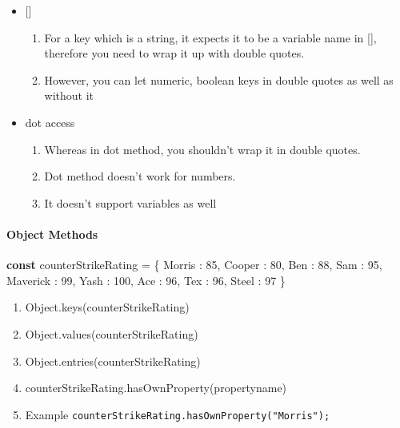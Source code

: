 \documentclass[
  paper=a4,
  ,captions=tableheading
]{scrartcl}
\newenvironment{Shaded}{}{}
\newcommand{\DataTypeTok}[1]{\textcolor[rgb]{0.56,0.13,0.00}{#1}}
\newcommand{\DecValTok}[1]{\textcolor[rgb]{0.25,0.63,0.44}{#1}}
\newcommand{\KeywordTok}[1]{\textcolor[rgb]{0.00,0.44,0.13}{\textbf{#1}}}
\newcommand{\NormalTok}[1]{#1}
\newcommand{\OperatorTok}[1]{\textcolor[rgb]{0.40,0.40,0.40}{#1}}
\providecommand{\tightlist}{%
  \setlength{\itemsep}{0pt}\setlength{\parskip}{0pt}}
\begin{document}
\begin{itemize}
\tightlist
\item
  {[}{]}

  \begin{enumerate}
  \def\labelenumi{\arabic{enumi}.}
  \tightlist
  \item
    For a key which is a string, it expects it to be a variable name in
    {[}{]}, therefore you need to wrap it up with double quotes.
  \item
    However, you can let numeric, boolean keys in double quotes as well
    as without it
  \end{enumerate}
\item
  dot access

  \begin{enumerate}
  \def\labelenumi{\arabic{enumi}.}
  \tightlist
  \item
    Whereas in dot method, you shouldn't wrap it in double quotes.
  \item
    Dot method doesn't work for numbers.
  \item
    It doesn't support variables as well
  \end{enumerate}
\end{itemize}

\hypertarget{object-methods}{%
\paragraph{Object Methods}\label{object-methods}}

\begin{Shaded}
\begin{Highlighting}[]
\KeywordTok{const}\NormalTok{ counterStrikeRating }\OperatorTok{=}\NormalTok{ \{}
    \DataTypeTok{Morris} \OperatorTok{:} \DecValTok{85}\OperatorTok{,}
    \DataTypeTok{Cooper} \OperatorTok{:} \DecValTok{80}\OperatorTok{,}
    \DataTypeTok{Ben} \OperatorTok{:} \DecValTok{88}\OperatorTok{,}
    \DataTypeTok{Sam} \OperatorTok{:} \DecValTok{95}\OperatorTok{,}
    \DataTypeTok{Maverick} \OperatorTok{:} \DecValTok{99}\OperatorTok{,}
    \DataTypeTok{Yash} \OperatorTok{:} \DecValTok{100}\OperatorTok{,}
    \DataTypeTok{Ace} \OperatorTok{:} \DecValTok{96}\OperatorTok{,}
    \DataTypeTok{Tex} \OperatorTok{:} \DecValTok{96}\OperatorTok{,}
    \DataTypeTok{Steel} \OperatorTok{:} \DecValTok{97}
\NormalTok{\}}
\end{Highlighting}
\end{Shaded}

\begin{enumerate}
\def\labelenumi{\arabic{enumi}.}
\tightlist
\item
  Object.keys(counterStrikeRating)
\item
  Object.values(counterStrikeRating)
\item
  Object.entries(counterStrikeRating)
\item
  counterStrikeRating.hasOwnProperty(propertyname)
\item
  Example \texttt{counterStrikeRating.hasOwnProperty("Morris");}
\end{enumerate}
\end{document}
